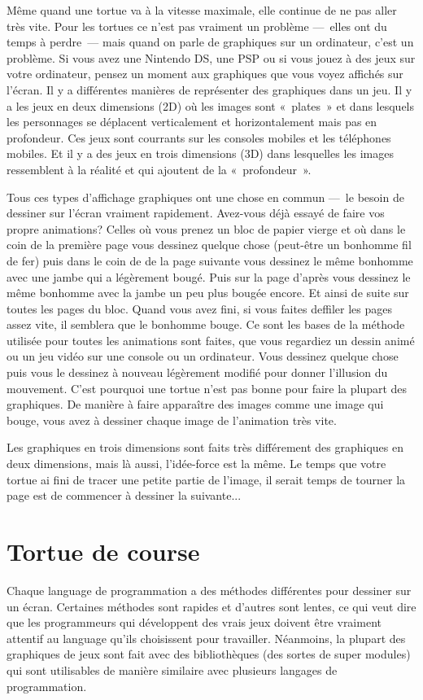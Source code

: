 Même quand une tortue va à la vitesse maximale, elle continue de ne pas aller très vite.
Pour les tortues ce n'est pas vraiment un problème ---~elles ont du temps à perdre~--- mais quand on parle de graphiques sur un ordinateur, c'est un problème. Si vous avez une Nintendo DS, une PSP ou si vous jouez à des 
jeux sur votre ordinateur, pensez un moment aux graphiques que vous voyez affichés sur l'écran. Il y a différentes
manières de représenter des graphiques dans un jeu. Il y a les jeux en deux dimensions (2D) où les images sont «~plates~» et dans lesquels les personnages se déplacent verticalement et horizontalement mais pas en profondeur.
Ces jeux sont courrants sur les consoles mobiles et les téléphones mobiles. Et il y a des jeux en trois dimensions (3D) dans lesquelles les images ressemblent à la réalité et qui ajoutent de la «~profondeur~».

Tous ces types d'affichage graphiques ont une chose en commun ---~le besoin de dessiner sur l'écran vraiment rapidement. Avez-vous déjà essayé de faire vos propre animations? Celles où vous prenez un bloc de papier vierge et où dans le coin de la première page vous dessinez quelque chose (peut-être un bonhomme fil de fer) puis dans le coin de de la page suivante vous dessinez le même bonhomme avec une jambe qui a légèrement bougé. Puis sur la page d'après vous dessinez le même bonhomme avec la jambe un peu plus bougée encore. Et ainsi de suite sur toutes les pages du bloc. Quand vous avez fini, si vous faites deffiler les pages assez vite, il semblera que le bonhomme bouge. Ce sont les bases de la méthode utilisée pour toutes les animations sont faites, que vous regardiez un dessin animé ou un jeu vidéo sur une console ou un ordinateur. Vous dessinez quelque chose puis vous le dessinez à nouveau légèrement modifié pour donner l'illusion du mouvement. C'est pourquoi une tortue n'est pas bonne pour faire la plupart des graphiques. De manière à faire apparaître des images comme une image qui bouge, vous avez à dessiner chaque image de l'animation très vite.

Les graphiques en trois dimensions sont faits très différement des graphiques en deux dimensions, mais là aussi, l'idée-force est la même. Le temps que votre tortue ai fini de tracer une petite partie de l'image, il serait temps de tourner la page est de commencer à dessiner la suivante...



\section{Tortue de course}
Chaque language de programmation a des méthodes différentes pour dessiner sur un écran. Certaines méthodes sont rapides et d'autres sont lentes, ce qui veut dire que les programmeurs qui développent des vrais jeux 
doivent être vraiment attentif au language qu'ils choisissent pour travailler. Néanmoins, la plupart des graphiques de jeux sont fait avec des bibliothèques (des sortes de super modules) qui sont utilisables de manière similaire avec plusieurs langages de programmation.

